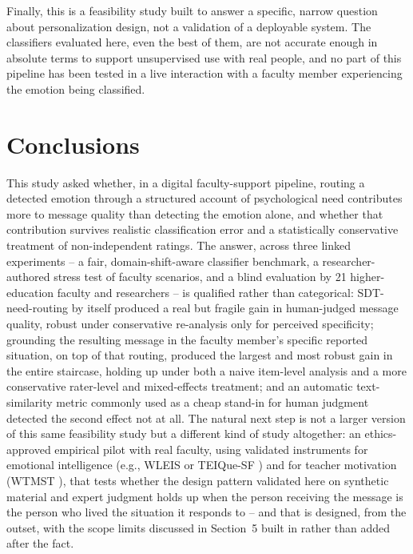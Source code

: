 \documentclass[higheredu,article,submit,pdftex,moreauthors]{Definitions/mdpi}
\begin{document}
Finally, this is a feasibility study built to answer a specific, narrow question about personalization design, not a validation of a deployable system. The classifiers evaluated here, even the best of them, are not accurate enough in absolute terms to support unsupervised use with real people, and no part of this pipeline has been tested in a live interaction with a faculty member experiencing the emotion being classified.

\section{Conclusions}

This study asked whether, in a digital faculty-support pipeline, routing a detected emotion through a structured account of psychological need contributes more to message quality than detecting the emotion alone, and whether that contribution survives realistic classification error and a statistically conservative treatment of non-independent ratings. The answer, across three linked experiments -- a fair, domain-shift-aware classifier benchmark, a researcher-authored stress test of faculty scenarios, and a blind evaluation by 21 higher-education faculty and researchers -- is qualified rather than categorical: SDT-need-routing by itself produced a real but fragile gain in human-judged message quality, robust under conservative re-analysis only for perceived specificity; grounding the resulting message in the faculty member's specific reported situation, on top of that routing, produced the largest and most robust gain in the entire staircase, holding up under both a naive item-level analysis and a more conservative rater-level and mixed-effects treatment; and an automatic text-similarity metric commonly used as a cheap stand-in for human judgment detected the second effect not at all. The natural next step is not a larger version of this same feasibility study but a different kind of study altogether: an ethics-approved empirical pilot with real faculty, using validated instruments for emotional intelligence (e.g., WLEIS \cite{wonglaw2002} or TEIQue-SF \cite{petrides2009}) and for teacher motivation (WTMST \cite{fernet2008}), that tests whether the design pattern validated here on synthetic material and expert judgment holds up when the person receiving the message is the person who lived the situation it responds to -- and that is designed, from the outset, with the scope limits discussed in Section~5 built in rather than added after the fact.
\end{document}
